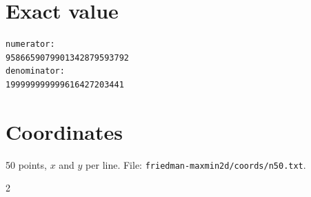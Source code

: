 \documentclass[11pt,a4paper]{article}
\begin{document}
\appendix
\section{Exact value}
{\small
\begin{verbatim}
numerator:
9586659079901342879593792
denominator:
199999999999616427203441
\end{verbatim}}

\section{Coordinates}
50 points, $x$ and $y$ per line. File: \texttt{friedman-maxmin2d/coords/n50.txt}.
{\tiny
\begin{multicols}{2}
\end{multicols}}
\end{document}

